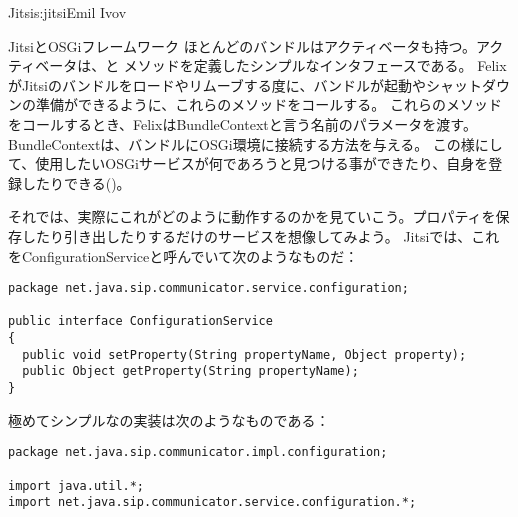 \begin{aosachapter}{Jitsi}{s:jitsi}{Emil Ivov}
\begin{aosasect1}{JitsiとOSGiフレームワーク}
ほとんどのバンドルはアクティベータも持つ。アクティベータは、と メソッドを定義したシンプルなインタフェースである。
FelixがJitsiのバンドルをロードやリムーブする度に、バンドルが起動やシャットダウンの準備ができるように、これらのメソッドをコールする。
これらのメソッドをコールするとき、FelixはBundleContextと言う名前のパラメータを渡す。BundleContextは、バンドルにOSGi環境に接続する方法を与える。
この様にして、使用したいOSGiサービスが何であろうと見つける事ができたり、自身を登録したりできる()。


それでは、実際にこれがどのように動作するのかを見ていこう。プロパティを保存したり引き出したりするだけのサービスを想像してみよう。
Jitsiでは、これをConfigurationServiceと呼んでいて次のようなものだ：

\pagebreak 

\begin{verbatim}
package net.java.sip.communicator.service.configuration;

public interface ConfigurationService
{
  public void setProperty(String propertyName, Object property);
  public Object getProperty(String propertyName);
}
\end{verbatim}

極めてシンプルなの実装は次のようなものである：

\begin{verbatim}
package net.java.sip.communicator.impl.configuration;

import java.util.*;
import net.java.sip.communicator.service.configuration.*;


\end{verbatim}
\end{aosasect1}
\end{aosachapter}
